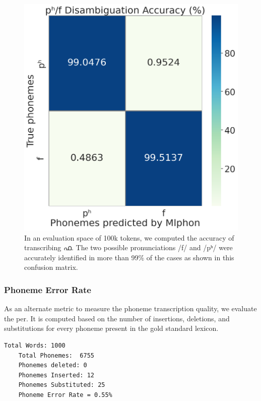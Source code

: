\begin{figure}[!ht]
	\centering
	\includegraphics[width=0.6\linewidth]{fa.png}
	\caption{In an evaluation space of 100k tokens, we computed the accuracy of transcribing  {\mal ഫ}. The two possible pronunciations /{\ipa f}/ and /{\ipa pʰ}/ were accurately identified in more than 99\% of the cases as shown in this confusion matrix.}

	\label{fig:faconfusion}
\end{figure}

\subsubsection{Phoneme Error Rate}

As an alternate metric to measure the phoneme transcription quality, we
evaluate the \gls{per}. It is computed based on the number of
insertions, deletions, and substitutions for every phoneme present in the gold
standard lexicon.


\begin{lstlisting}[basicstyle=\ttfamily]
	Total Words: 1000
	Total Phonemes:  6755
	Phonemes deleted: 0
	Phonemes Inserted: 12
	Phonemes Substituted: 25
	Phoneme Error Rate = 0.55%
\end{lstlisting}

